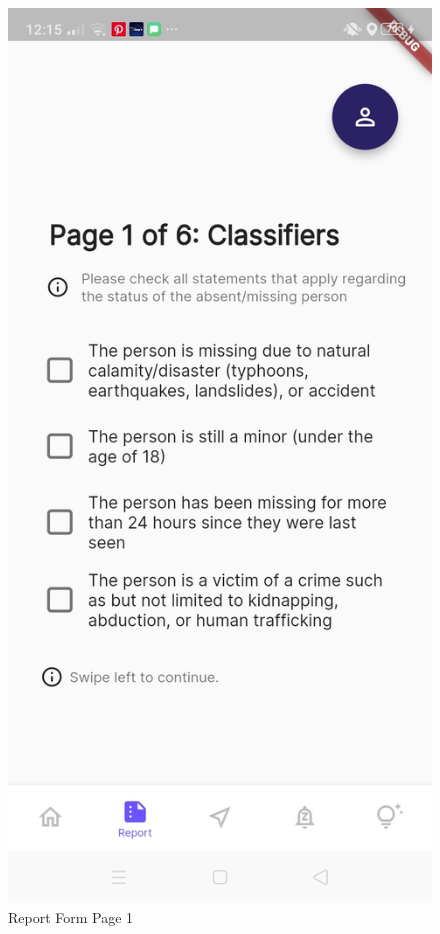 \begin{figure}[!h]
    \centering
    \begin{minipage}[c]{0.50\linewidth}
        \centering
        \includegraphics[scale=0.15]{figures/Chapter4/Main/p1.jpg}
        \caption{Report Form Page 1}
        \label{fig:p1}
    \end{minipage}
\end{figure}
